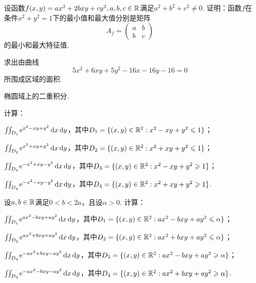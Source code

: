 \begin{mybox}
  \begin{problem}[一个二次型的条件极值.]

    设函数$f(x,y)=ax^2+2bxy+cy^2,a,b,c\in\mathbb R$满足$a^2+b^2+c^2\ne0$. 证明：函数$f$在条件$x^2+y^2=1$下的最小值和最大值分别是矩阵
    \[
      A_f = \begin{pmatrix}
        a & b \\
        b & c
      \end{pmatrix}
    \]
    的最小和最大特征值.
  \end{problem}
\end{mybox}

\begin{problem}
  求出由曲线
  \[
    5x^2 + 6xy + 5y^2 - 16x - 16y - 16 = 0
  \]
  所围成区域的面积.
\end{problem}

{\noindent \kaishu 椭圆域上的二重积分.}

\begin{problem}
  计算：
  \begin{enum}
    \item $\iint_{D_1}\operatorname{\!\!\;\mathrm e}^{x^2-xy+y^2}\mathop{}\!\mathrm d x\mathop{}\!\mathrm d y$，其中$D_1=\{(x,y)\in\mathbb R^2:x^2-xy+y^2\leqslant1\}$；
    \item $\iint_{D_2}\operatorname{\!\!\;\mathrm e}^{x^2+xy+y^2}\mathop{}\!\mathrm d x\mathop{}\!\mathrm d y$，其中$D_2=\{(x,y)\in\mathbb R^2:x^2+xy+y^2\leqslant1\}$；
    \item $\iint_{D_3}\operatorname{\!\!\;\mathrm e}^{-x^2+xy-y^2}\mathop{}\!\mathrm d x\mathop{}\!\mathrm d y$，其中$D_3=\{(x,y)\in\mathbb R^2:x^2-xy+y^2\geqslant1\}$；
    \item $\iint_{D_4}\operatorname{\!\!\;\mathrm e}^{-x^2-xy-y^2}\mathop{}\!\mathrm d x\mathop{}\!\mathrm d y$，其中$D_4=\{(x,y)\in\mathbb R^2:x^2+xy+y^2\geqslant1\}$.
  \end{enum}
\end{problem}

\begin{problem}
  设$a,b\in\mathbb R$满足$0<b<2a$，且设$\alpha>0$. 计算：
  \begin{enum}
    \item $\iint_{D_1}\operatorname{\!\!\;\mathrm e}^{ax^2-bxy+ay^2}\mathop{}\!\mathrm d x\mathop{}\!\mathrm d y$，其中$D_1=\{(x,y)\in\mathbb R^2:ax^2-bxy+ay^2\leqslant\alpha\}$；
    \item $\iint_{D_2}\operatorname{\!\!\;\mathrm e}^{ax^2+bxy+ay^2}\mathop{}\!\mathrm d x\mathop{}\!\mathrm d y$，其中$D_2=\{(x,y)\in\mathbb R^2:ax^2+bxy+ay^2\leqslant\alpha\}$；
    \item $\iint_{D_3}\operatorname{\!\!\;\mathrm e}^{-ax^2+bxy-ay^2}\mathop{}\!\mathrm d x\mathop{}\!\mathrm d y$，其中$D_3=\{(x,y)\in\mathbb R^2:ax^2-bxy+ay^2\geqslant\alpha\}$；
    \item $\iint_{D_3}\operatorname{\!\!\;\mathrm e}^{-ax^2-bxy-ay^2}\mathop{}\!\mathrm d x\mathop{}\!\mathrm d y$，其中$D_4=\{(x,y)\in\mathbb R^2:ax^2+bxy+ay^2\geqslant\alpha\}$.
  \end{enum}
\end{problem}

